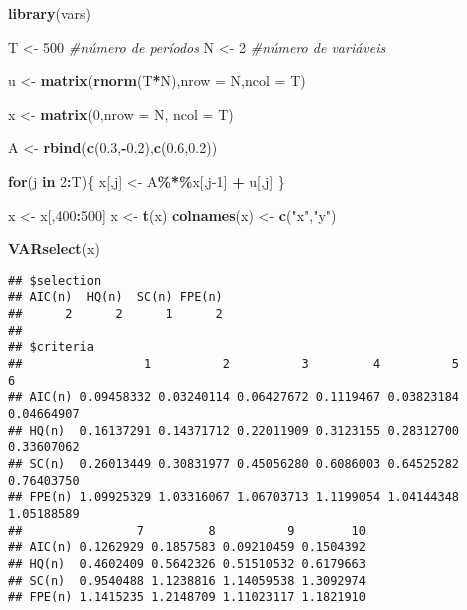 \documentclass[
]{book}
\newenvironment{Shaded}{\begin{snugshade}}{\end{snugshade}}
\newcommand{\CommentTok}[1]{\textcolor[rgb]{0.56,0.35,0.01}{\textit{#1}}}
\newcommand{\ControlFlowTok}[1]{\textcolor[rgb]{0.13,0.29,0.53}{\textbf{#1}}}
\newcommand{\DataTypeTok}[1]{\textcolor[rgb]{0.13,0.29,0.53}{#1}}
\newcommand{\DecValTok}[1]{\textcolor[rgb]{0.00,0.00,0.81}{#1}}
\newcommand{\FloatTok}[1]{\textcolor[rgb]{0.00,0.00,0.81}{#1}}
\newcommand{\KeywordTok}[1]{\textcolor[rgb]{0.13,0.29,0.53}{\textbf{#1}}}
\newcommand{\NormalTok}[1]{#1}
\newcommand{\OperatorTok}[1]{\textcolor[rgb]{0.81,0.36,0.00}{\textbf{#1}}}
\newcommand{\StringTok}[1]{\textcolor[rgb]{0.31,0.60,0.02}{#1}}
\begin{document}
\begin{Shaded}
\begin{Highlighting}[]
\KeywordTok{library}\NormalTok{(vars)}

\NormalTok{T \textless{}{-}}\StringTok{ }\DecValTok{500} \CommentTok{\#número de períodos}
\NormalTok{N \textless{}{-}}\StringTok{ }\DecValTok{2} \CommentTok{\#número de variáveis}

\NormalTok{u \textless{}{-}}\StringTok{ }\KeywordTok{matrix}\NormalTok{(}\KeywordTok{rnorm}\NormalTok{(T}\OperatorTok{*}\NormalTok{N),}\DataTypeTok{nrow =}\NormalTok{ N,}\DataTypeTok{ncol =}\NormalTok{ T)}

\NormalTok{x \textless{}{-}}\StringTok{ }\KeywordTok{matrix}\NormalTok{(}\DecValTok{0}\NormalTok{,}\DataTypeTok{nrow =}\NormalTok{ N, }\DataTypeTok{ncol =}\NormalTok{ T)}

\NormalTok{A \textless{}{-}}\StringTok{ }\KeywordTok{rbind}\NormalTok{(}\KeywordTok{c}\NormalTok{(}\FloatTok{0.3}\NormalTok{,}\OperatorTok{{-}}\FloatTok{0.2}\NormalTok{),}\KeywordTok{c}\NormalTok{(}\FloatTok{0.6}\NormalTok{,}\FloatTok{0.2}\NormalTok{))}

\ControlFlowTok{for}\NormalTok{(j }\ControlFlowTok{in} \DecValTok{2}\OperatorTok{:}\NormalTok{T)\{}
\NormalTok{  x[,j] \textless{}{-}}\StringTok{ }\NormalTok{A}\OperatorTok{\%*\%}\NormalTok{x[,j}\DecValTok{{-}1}\NormalTok{] }\OperatorTok{+}\StringTok{ }\NormalTok{u[,j]}
\NormalTok{\}}

\NormalTok{x \textless{}{-}}\StringTok{ }\NormalTok{x[,}\DecValTok{400}\OperatorTok{:}\DecValTok{500}\NormalTok{]}
\NormalTok{x \textless{}{-}}\StringTok{ }\KeywordTok{t}\NormalTok{(x)}
\KeywordTok{colnames}\NormalTok{(x) \textless{}{-}}\StringTok{ }\KeywordTok{c}\NormalTok{(}\StringTok{"x"}\NormalTok{,}\StringTok{"y"}\NormalTok{)}

\KeywordTok{VARselect}\NormalTok{(x) }
\end{Highlighting}
\end{Shaded}

\begin{verbatim}
## $selection
## AIC(n)  HQ(n)  SC(n) FPE(n) 
##      2      2      1      2 
## 
## $criteria
##                 1          2          3         4          5          6
## AIC(n) 0.09458332 0.03240114 0.06427672 0.1119467 0.03823184 0.04664907
## HQ(n)  0.16137291 0.14371712 0.22011909 0.3123155 0.28312700 0.33607062
## SC(n)  0.26013449 0.30831977 0.45056280 0.6086003 0.64525282 0.76403750
## FPE(n) 1.09925329 1.03316067 1.06703713 1.1199054 1.04144348 1.05188589
##                7         8          9        10
## AIC(n) 0.1262929 0.1857583 0.09210459 0.1504392
## HQ(n)  0.4602409 0.5642326 0.51510532 0.6179663
## SC(n)  0.9540488 1.1238816 1.14059538 1.3092974
## FPE(n) 1.1415235 1.2148709 1.11023117 1.1821910
\end{verbatim}
\end{document}
